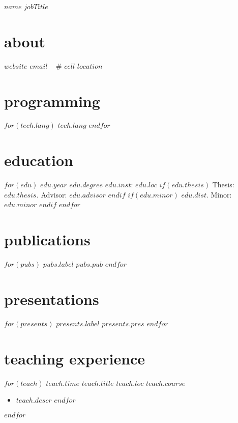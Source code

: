 \documentclass[]{friggeri-cv}
\begin{document}
\header
  {$name$}
  {$jobTitle$}



\begin{aside}
  \section{about}
    \href{http://$website$}{$website$}
    \href{mailto:$email$}{$email$}
    ~
    \# $cell$
    $location$
    \section{programming}
    $for(tech.lang)$
      $tech.lang$
    $endfor$
\end{aside}



\section{education}
\begin{entrylist}
$for(edu)$
  \entry
  {$edu.year$}
  {$edu.degree$}
  {$edu.inst$: $edu.loc$}
  $if(edu.thesis)$
    {Thesis: \textit{$edu.thesis$.} Advisor: $edu.advisor$}
  $endif$
  $if(edu.minor)$
    {$edu.dist$. Minor: $edu.minor$}
  $endif$
$endfor$
\end{entrylist}



\section{publications}
\begin{entrylist}
$for(pubs)$
  \entry
  {$pubs.label$}
  {}
  {}
  {$pubs.pub$}
$endfor$
\end{entrylist}



\section{presentations}
\begin{entrylist}
$for(presents)$
  \entry
  {$presents.label$}
  {}
  {}
  {$presents.pres$}
$endfor$
\end{entrylist}



\section{teaching experience}
\begin{entrylist}
$for(teach)$
  \entry
  {$teach.time$}
  {$teach.title$}
  {$teach.loc$}
  {$teach.course$}
  \setlength\parskip{0pt}
  \begin{itemize}[noitemsep, leftmargin=0.2in]
    $for(teach.descr)$
      \item $teach.descr$
    $endfor$
  \end{itemize}
  \setlength\parskip{12pt}
$endfor$
\end{entrylist}
\end{document}
